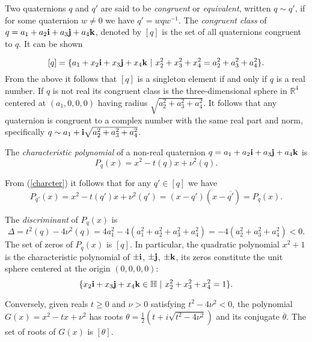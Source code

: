 \documentclass{article}
\theoremstyle{definition}
\begin{document}
Two quaternions $q$ and $q'$ are said to be {\it congruent} or {\it
equivalent}, written $q \sim q'$, if for some  quaternion $w \not
=0$ we have $q'=wqw^{-1}.$ The {\it congruent class} of $q=a_1+a_2{\bf
i}+a_3{\bf j}+a_4{\bf k}$, denoted by $[q]$ is the set of all
quaternions congruent to $q$. It can be shown

\begin{equation} \label{charcter}
[q]=\{a_1+x_2{\bf i}+x_3{\bf j}+x_4{\bf k}~|~ x_2^2+x_3^2+x_4^2=a_2^2+a_3^2+a_4^2\}.
\end{equation}
From the above it follows that  $[q]$ is a singleton element if and
only if $q$ is a real number. If $q$ is not real its congruent class
is the three-dimensional sphere in $ \mathbb{R}^4$ centered at
$(a_1,0,0,0)$ having radius $\sqrt{a_2^2+a_3^2+a_4^2}$. It
follows that any quaternion is congruent to a complex number with
the same real part and norm, specifically $q \sim a_1+ {\bf i}
\sqrt{a_2^2+a_3^2+a_4^2}$.

The {\it characteristic polynomial} of a non-real quaternion $q=a_1+a_2{\bf i}+a_3{\bf j}+a_4{\bf k}$ is
\begin{equation}
P_q(x)=x^2 - t(q)x+ \nu^2(q).
\end{equation}

From (\ref{charcter}) it follows that for any $q' \in [q]$ we have
\begin{equation} \label{Char2}
P_{q'}(x)=x^2 - t(q')x+ \nu^2(q')=(x-q')(x-\overline{q'})=P_q(x).
\end{equation}

The {\it discriminant} of $P_q(x)$ is
\begin{equation}
\Delta=t^2(q)-4\nu^2(q)=4a_1^2-4(a_1^2+a_2^2+a_3^2+a_4^2)=-4(a_2^2+a_3^2+a_4^2) <0.\end{equation}
The set of zeros of $P_q(x)$ is $[q]$. In particular, the quadratic
polynomial $x^2+1$ is the characteristic polynomial of $\pm {\bf
i}$, $\pm {\bf j}$, $\pm {\bf k}$, its zeros constitute the unit
sphere centered at the origin $(0,0,0,0)$:
\begin{equation}
\{x_2{\bf i}+x_3{\bf j}+x_4{\bf k} \in \mathbb{H}~|~ x_2^2+x_3^2+x_4^2 =1\}.
\end{equation}

Conversely, given reals $t \geq 0$ and $\nu >0$ satisfying $t^2-4
\nu^2 <0$, the polynomial $G(x)=x^2-tx+\nu^2$ has roots
$\theta=\frac{1}{2}(t + i\sqrt{t^2-4 \nu^2})$ and its conjugate
$\overline \theta$. The set of roots of $G(x)$ is $[\theta]$.
\end{document}
